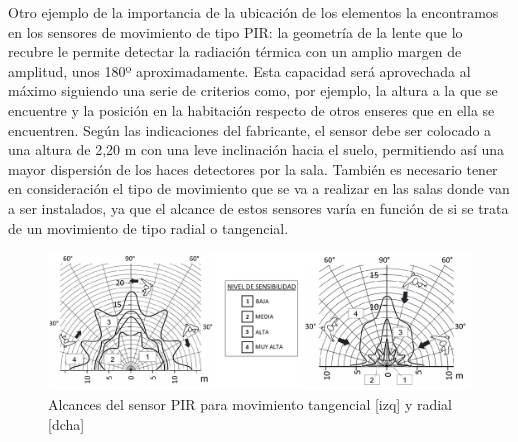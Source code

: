 Otro ejemplo de la importancia de la ubicación de los elementos la encontramos en los sensores de movimiento de tipo PIR: la geometría de la lente que lo recubre le permite detectar la radiación térmica con un amplio margen de amplitud, unos 180º aproximadamente. Esta capacidad será aprovechada al máximo siguiendo una serie de criterios como, por ejemplo, la altura a la que se encuentre y la posición en la habitación respecto de otros enseres que en ella se encuentren. Según las indicaciones del fabricante, el sensor debe ser colocado a una altura de 2,20 m con una leve inclinación hacia el suelo, permitiendo así una mayor dispersión de los haces detectores por la sala. También es necesario tener en consideración el tipo de movimiento que se va a realizar en las salas donde van a ser instalados, ya que el alcance de estos sensores varía en función de si se trata de un movimiento de tipo radial o tangencial.
\begin{figure}[H]
\includegraphics[width=1.15\textwidth]{figures/alcance_PIR.png}   
\caption{Alcances del sensor PIR para movimiento tangencial [izq] y radial [dcha]}
\label{fig:alcance_PIR}
\end{figure}

